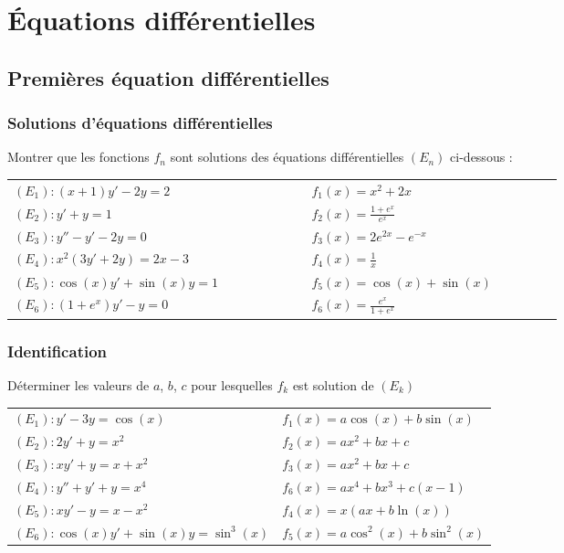 \documentclass[oneside,12pt]{book}          %
\begin{document}
\chapter{Équations différentielles}
\newpage
 
\section{Premières équation différentielles}


\subsection{Solutions d'équations différentielles}
Montrer que les fonctions $f_n$ sont solutions des équations différentielles $(E_n)$ ci-dessous :

\begin{tabular}{p{0.4\linewidth}p{0.3\linewidth}}
    $(E_1):(x+1)y'-2y=2$ & $f_1(x)=x^2+2x$\\
    $(E_2):y'+y=1$ & $f_2(x)=\frac{1+e^x}{e^x}$ \\
    $(E_3):y''-y'-2y=0$ & $f_3(x)=2e^{2x}-e^{-x}$\\
    $(E_4):x^2(3y'+2y)=2x-3$ & $f_4(x)=\frac{1}{x}$ \\
    $(E_5):\cos(x)y'+\sin(x)y=1$ & $f_5(x)=\cos(x)+\sin(x)$ \\
    $(E_6):(1+e^x)y'-y=0$ & $f_6(x)=\frac{e^x}{1+e^x}$
\end{tabular}



\subsection{Identification}
Déterminer les valeurs de $a$, $b$, $c$ pour lesquelles $f_k$ est solution de $(E_k)$ 

\begin{tabular}{ll}
$(E_1) : y' - 3y = \cos(x)$ & $f_1(x) = a \cos(x) + b \sin(x)$ \\
$(E_2) : 2y' + y = x^2$ & $f_2(x) = a x^2 + b x + c$ \\
$(E_3) : xy'+y=x+x^2$ & $f_3(x) = a x^2 + b x + c$ \\
$(E_4) : y''+y'+y=x^4$ & $f_6(x) = ax^4+bx^3+c(x-1)$\\
$(E_5) : xy'-y=x-x^2$ & $f_4(x) = x (ax + b \ln(x))$ \\
$(E_6) : \cos(x)y'+\sin(x)y=\sin^3(x)$ & $f_5(x) = a \cos^2(x) + b \sin^2(x)$ \\
\end{tabular}
\end{document}
